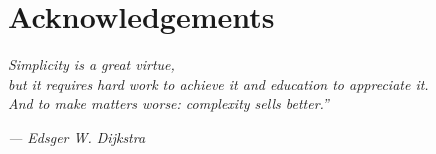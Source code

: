 
 \chapter*{Acknowledgements}

  \emph{Simplicity is a great virtue,\\
  but it requires hard work to achieve it and education to appreciate it.\\
  And to make matters worse: complexity sells better.''}

  \hfill\emph{--- Edsger W. Dijkstra}\\





